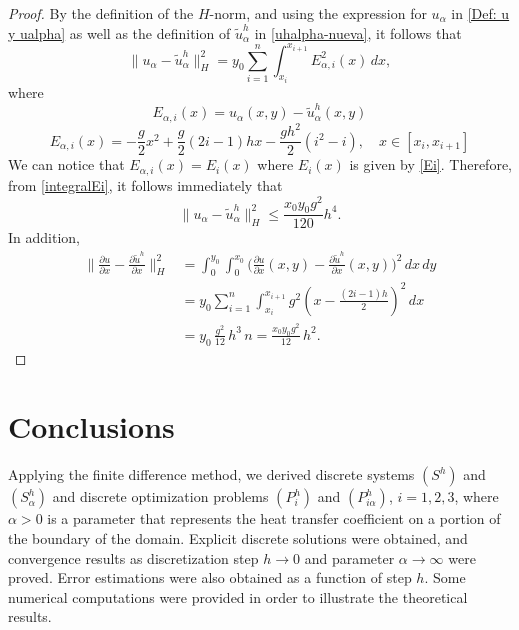 \documentclass[11pt]{article}
\newcommand{\dee}{d}
\newcommand\pder[2][]{\ensuremath{\tfrac{\partial#1}{\partial#2}}}
\begin{document}
\begin{flushleft}
\begin{proof}
By the definition of the $H$-norm, and using the expression for $u_\alpha$ in \eqref{Def: u y ualpha} as well as the definition of ${\widetilde{u}^h_\alpha}$ in \eqref{uhalpha-nueva}, it follows that
\begin{equation}
\lVert u_\alpha - {\widetilde{u}^h_\alpha} \rVert_H^2 
= y_0 \sum_{i=1}^n \int_{x_i}^{x_{i+1}} E_{\alpha,i}^2(x)\, dx,
\end{equation}
where 
\[
E_{\alpha,i}(x) = u_\alpha(x,y) - {\widetilde{u}^h_\alpha}(x,y) \] \begin{equation}
\label{eq:error_expandido}
E_{\alpha,i}(x)= -\frac{g}{2} x^2 +\frac{ g}{2} \left(2i -1\right) h x  - \frac{g h^2}{2} (i^2 - i), \quad x \in [x_i, x_{i+1}]
\end{equation}
We can notice that $E_{\alpha,i}(x)=E_i(x)$ where $E_i(x)$ is given by \eqref{Ei}. Therefore, from \eqref{integralEi}, it follows immediately that 
\[
\lVert u_\alpha - {\widetilde{u}^h_\alpha} \rVert_H^2 \leq \frac{x_0y_0g^2}{120} h^4. 
\]
In addition,
\begin{equation}\label{norma-derivadaUALPHA-cuadrado}
\begin{aligned}
\bigl\|\pder[u]{x}-\pder[{\widetilde{u}^h}]{x}\bigr\|_{H}^{2}
&= \int_{0}^{y_0}\!\int_{0}^{x_0}
\bigl(\pder[u]{x}(x,y)-\pder[{\widetilde{u}^h}]{x}(x,y)\bigr)^2
\,\dee x\,\dee y \\[1ex]
&= y_0 \sum_{i=1}^{n} \int_{x_i}^{x_{i+1}}
g^2\!\left(x-\frac{(2i-1)h}{2}\right)^2 \,\dee x \\[1ex]
&= y_0\,\frac{g^2}{12}\,h^3\,n
= \frac{x_0 y_0 g^2}{12}\,h^2 .
\end{aligned}
\end{equation}
\end{proof}


  \section{Conclusions}\label{sec8}
  
  

Applying the finite difference method, we derived discrete systems $({S^h})$ and ${(S^h_\alpha)}$ and discrete optimization problems ${(P^h_{i})}$ and ${(P^h_{i\alpha})}$, $i=1,2,3$, where $\alpha>0$ is a parameter that represents the heat transfer coefficient on a portion of the boundary of the domain. Explicit discrete solutions were obtained, and convergence results as discretization step $h \to 0$ and parameter $\alpha \to \infty$ were proved. Error estimations were also obtained as a function of step $h$. Some numerical computations were  provided in order to illustrate the  theoretical results.





\end{flushleft}
\end{document}
